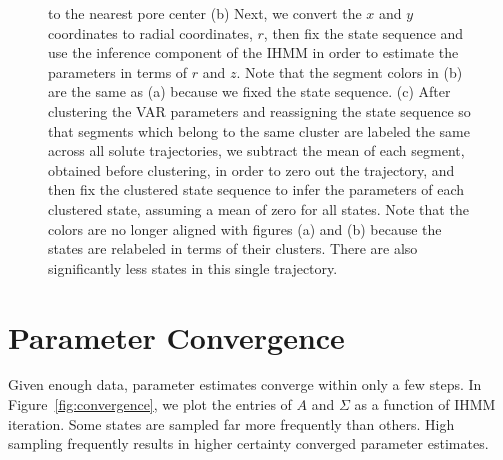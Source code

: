 \documentclass{article}
\begin{document}
\begin{figure}
{	to the nearest pore center (b) Next, we convert the $x$ and $y$ 	
	coordinates to radial coordinates, $r$, then fix the state sequence and use the inference 
	component of the IHMM in order to estimate the parameters in terms of $r$ and $z$. Note that
	the segment colors in (b) are the same as (a) because we fixed the state sequence.
	(c) After clustering the VAR parameters and reassigning the state sequence so that segments 
	which belong to the same cluster are labeled the same across all solute trajectories, we subtract
	the mean of each segment, obtained before clustering, in order to zero out the
  	trajectory, and then fix the clustered state sequence to infer the parameters of each clustered 
  	state, assuming a mean of zero for all states. Note that the colors are no longer aligned with 
  	figures (a) and (b) because the states are relabeled in terms of their clusters. There are
  	also significantly less states in this single trajectory.
	}\label{fig:hmm_demo}
  \end{figure}
  
  \newpage
  
  \section{Parameter Convergence}\label{section:convergence}
  
  Given enough data, parameter estimates converge within only a few steps. In 
  Figure~\ref{fig:convergence}, we plot the entries of $A$ and $\Sigma$ as 
  a function of IHMM iteration. Some states are sampled far more frequently
  than others. High sampling frequently results in higher certainty converged
  parameter estimates.
  
\end{document}
